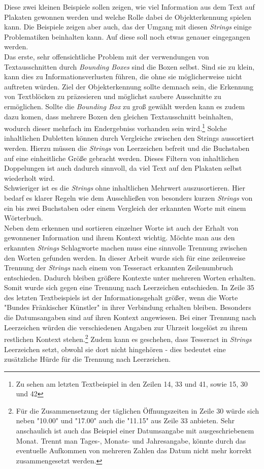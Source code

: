 \documentclass[a4paper,12pt,ngerman]{article}
\begin{document}
Diese zwei kleinen Beispiele sollen zeigen, wie viel Information aus dem Text auf Plakaten gewonnen werden und welche Rolle dabei de Objekterkennung spielen kann. Die Beispiele zeigen aber auch, das der Umgang mit diesen \textit{Strings} einige Problematiken beinhalten kann. Auf diese soll noch etwas genauer eingegangen werden.\\
Das erste, sehr offensichtliche Problem mit der verwendungen von Textausschnitten durch \textit{Bounding Boxes} sind die Boxen selbst. Sind sie zu klein, kann dies zu Informationsverlusten führen, die ohne sie möglicherweise nicht auftreten würden. Ziel der Objekterkennung sollte demnach sein, die Erkennung von Textblöcken zu präzesieren und möglichst saubere Ausschnitte zu ermöglichen. Sollte die \textit{Bounding Box} zu groß gewählt werden kann es zudem dazu komen, dass mehrere Boxen den gleichen Textausschnitt beinhalten, wodurch dieser mehrfach im Endergebniss vorhanden sein wird.\footnote{Zu sehen am letzten Textbeispiel in den Zeilen 14, 33 und 41, sowie 15, 30 und 42} Solche inhaltlichen Dubletten können durch Vergleiche zwischen den Strings aussortiert werden. Hierzu müssen die \textit{Strings} von Leerzeichen befreit und die Buchstaben auf eine einheitliche Größe gebracht werden. Dieses Filtern von inhaltlichen Doppelungen ist auch dadurch sinnvoll, da viel Text auf den Plakaten selbst wiederholt wird.\\
Schwieriger ist es die \textit{Strings} ohne inhaltlichen Mehrwert auszusortieren. Hier bedarf es klarer Regeln wie dem Ausschließen von besonders kurzen \textit{Strings} von ein bis zwei Buchstaben oder einem Vergleich der erkannten Worte mit einem Wörterbuch.\\
Neben dem erkennen und sortieren einzelner Worte ist auch der Erhalt von gewonnener Information und ihrem Kontext wichtig. Möchte man aus den erkannten \textit{Strings} Schlagworte machen muss eine sinnvolle Trennung zwischen den Worten gefunden werden. In dieser Arbeit wurde sich für eine zeilenweise Trennung der \textit{Strings} nach einem von Tesseract erkannten Zeilenumbruch entschieden. Dadurch bleiben größere Kontexte unter mehreren Worten erhalten. Somit wurde sich gegen eine Trennung nach Leerzeichen entschieden. In Zeile 35 des letzten Textbeispiels ist der Informationsgehalt größer, wenn die Worte "Bundes Fränkischer Künstler" in ihrer Verbindung erhalten bleiben. Besonders die Datumsangaben sind auf ihren Kontext angewiesen. Bei einer Trennung nach Leerzeichen würden die verschiedenen Angaben zur Uhrzeit losgelöst zu ihrem restlichen Kontext stehen.\footnote{Für die Zusammensetzung der täglichen Öffnungszeiten in Zeile 30 würde sich neben "10.00" und "17.00" auch die "11.15" aus Zeile 33 anbieten. Sehr anschaulich ist auch das Beispiel einer Datumsangabe mit ausgeschriebenem Monat. Trennt man Tages-, Monats- und Jahresangabe, könnte durch das eventuelle Aufkommen von mehreren Zahlen das Datum nicht mehr korrekt zusammengesetzt werden.} Zudem kann es geschehen, dass Tesseract in \textit{Strings} Leerzeichen setzt, obwohl sie dort nicht hingehören - dies bedeutet eine zusätzliche Hürde für die Trennung nach Leerzeichen.\\
\end{document}
